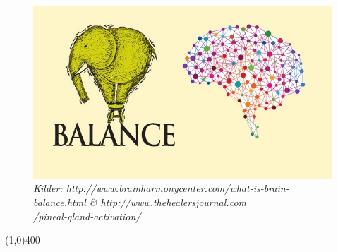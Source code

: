 \begin{figure}[H]
	\centering
	\begin{minipage}[b]{1\textwidth}
		\includegraphics[width=\textwidth]{figures/Midlertidig1.JPG}
		\caption*{\tiny{\textit{Kilder: http://www.brainharmonycenter.com/what-is-brain-balance.html \& http://www.thehealersjournal.com \\ /pineal-gland-activation/}}}
	\end{minipage}
	\hfill
\end{figure}

\vspace*{\fill}

\begin{center}
\line(1,0){400}
\end{center}
